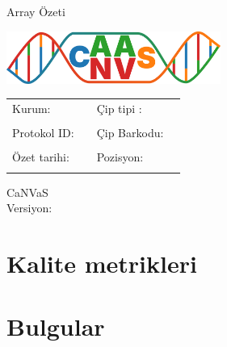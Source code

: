 \documentclass{article}
\newcommand{\institute}{
}
\newcommand{\protocolId}{
}
\newcommand{\summaryDate}{
}
\newcommand{\chipId}{
}
\newcommand{\chipPosition}{
}
\newcommand{\chipType}{
}
\newcommand{\canvasVersion}{
}
\begin{document}
\shorthandoff{=}

\begin{titlepage}
\begin{center}
\Huge \textsf{Array Özeti}
\end{center}
\vspace*{2cm}
\begin{center}
\includegraphics[width=7cm]{canvas_logo.png}

\vspace*{4cm}

\begin{tabular}{l l l l}
\textsf{Kurum: \institute } & \hspace{1cm} & \textsf{Çip tipi : \chipType} \\ \\
\textsf{Protokol ID: \protocolId} & \hspace{1cm} & \textsf{Çip Barkodu: \chipId} \\ \\
\textsf{Özet tarihi: \summaryDate} & \hspace{1cm} & \textsf{Pozisyon: \chipPosition} \\ \\
\end{tabular}

\vspace*{3cm}

\textsf{\LARGE CaNVaS} \\[0.5cm]
\textsf{Versiyon: \canvasVersion}
\end{center}
\end{titlepage}


\section{Kalite metrikleri}


\section{Bulgular}


%
\end{document}
